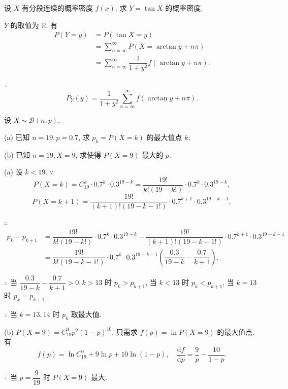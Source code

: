 \documentclass[color=black,device=normal,lang=cn]{elegantnote}
\numberwithin{equation}{section}
\theoremstyle{plain}
\numberwithin{exercise}{exsection}
\begin{document}
\addtocounter{exercise}{2}
\begin{exercise}[c]%
    设 $X$ 有分段连续的概率密度 $f(x)$. 求 $Y=\tan X$ 的概率密度.
\end{exercise}
\begin{solution}
    $Y$ 的取值为 $\mathbb{R}$. 有
    \begin{align*}
        P(Y=y) & =P(\tan X=y) \\
        & =\sum\limits_{n=\infty}^\infty P(X=\arctan y+n\pi) \\
        & =\sum\limits_{n=\infty}^\infty\dfrac{1}{1+y^2}f(\arctan y+n\pi).
    \end{align*}

    $\therefore$
    \[P_Y(y)=\dfrac{1}{1+y^2}\sum\limits_{n=\infty}^\infty f(\arctan y+n\pi).\]
\end{solution}
\newpage
\begin{exercise}%
    设 $X\sim\mathcal{B}(n,p)$.

    (a) 已知 $n=19,p=0.7$, 求 $p_k=P(X=k)$ 的最大值点 $k$;

    (b) 已知 $n=19,X=9$, 求使得 $P(X=9)$ 最大的 $p$.
\end{exercise}
\begin{solution}
    (a) 设 $k<19$. $\because$
    \[P(X=k)=C_{19}^k\cdot0.7^k\cdot0.3^{19-k}=\dfrac{19!}{k!(19-k!)}\cdot0.7^k\cdot0.3^{19-k},\]
    \[P(X=k+1)=\dfrac{19!}{(k+1)!(19-k-1!)}\cdot0.7^{k+1}\cdot0.3^{19-k-1},\]

    $\therefore$
    \begin{align*}
        p_k-p_{k+1} & =\dfrac{19!}{k!(19-k!)}\cdot0.7^k\cdot0.3^{19-k}-\dfrac{19!}{(k+1)!(19-k-1!)}\cdot0.7^{k+1}\cdot0.3^{19-k-1} \\
        & =\dfrac{19!}{k!(19-k-1!)}\cdot0.7^k\cdot0.3^{19-k-1}\left(\dfrac{0.3}{19-k}-\dfrac{0.7}{k+1}\right).
    \end{align*}

    $\therefore$ 当 $\dfrac{0.3}{19-k}-\dfrac{0.7}{k+1}>0,k>13$ 时 $p_k>p_{k+1}$, 当 $k<13$ 时 $p_k<p_{k+1}$, 当 $k=13$ 时 $p_k=p_{k+1}$.

    $\therefore$ 当 $k=13,14$ 时 $p_k$ 取最大值.

    (b) $P(X=9)=C_{19}^9p^9(1-p)^{10}$. 只需求 $f(p)=\ln P(X=9)$ 的最大值点. 有
    \[f(p)=\ln C_{19}^9+9\ln p+10\ln(1-p),\quad\dfrac{\mathrm{d}f}{\mathrm{d}p}=\dfrac{9}{p}-\dfrac{10}{1-p}.\]

    $\therefore$ 当 $p=\dfrac{9}{19}$ 时 $P(X=9)$ 最大.
\end{solution}
\end{document}
